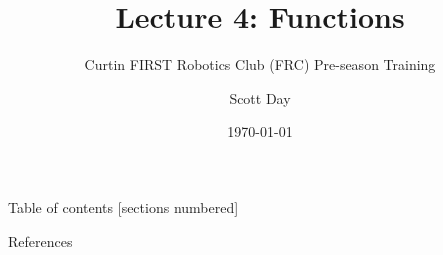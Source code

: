 \documentclass[9pt]{beamer}              %
\title{Lecture 4: Functions}
\subtitle{Curtin FIRST Robotics Club (FRC) Pre-season Training}
\date{\today}
\author{Scott Day}
\institute{Curtin University}
\begin{document}


\maketitle


\begin{frame}{Table of contents}
  [sections numbered]
  \tableofcontents[hideallsubsections]
\end{frame}





\begin{frame}[allowframebreaks]{References}
  
  
\end{frame}

\end{document}
